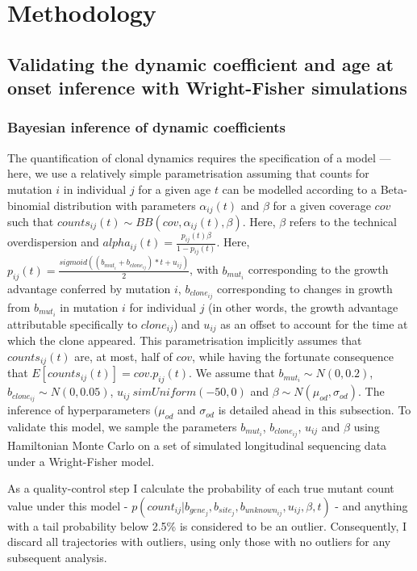 \section{Methodology}

\subsection{Validating the dynamic coefficient and age at onset inference with Wright-Fisher simulations}

\subsubsection{Bayesian inference of dynamic coefficients}

The quantification of clonal dynamics requires the specification of a model --- here, we use a relatively simple parametrisation assuming that counts for mutation $i$ in individual $j$ for a given age $t$ can be modelled according to a Beta-binomial distribution with parameters $\alpha_{ij}(t)$ and $\beta$ for a given coverage $cov$ such that $counts_{ij}(t) \sim BB(cov,\alpha_{ij}(t),\beta)$. Here, $\beta$ refers to the technical overdispersion and $alpha_{ij}(t) = \frac{p_{ij}(t)\beta}{1-p_{ij}(t)}$. Here, $p_{ij}(t) = \frac{sigmoid((b_{mut_i} + b_{clone_{ij}}) * t + u_{ij})}{2}$, with $b_{mut_i}$ corresponding to the growth advantage conferred by mutation $i$, $b_{clone_{ij}}$ corresponding to changes in growth from $b_{mut_i}$ in mutation $i$ for individual $j$ (in other words, the growth advantage attributable specifically to $clone_{ij}$) and $u_{ij}$ as an offset to account for the time at which the clone appeared. This parametrisation implicitly assumes that $counts_{ij}(t)$ are, at most, half of $cov$, while having the fortunate consequence that $E[counts_{ij}(t)] = cov.p_{ij}(t)$. We assume that $b_{mut_i} \sim N(0,0.2)$, $b_{clone_{ij}} \sim N(0,0.05)$, $u_{ij} \ sim Uniform(-50,0)$ and $\beta \sim N(\mu_{od},\sigma_{od})$. The inference of hyperparameters $(\mu_{od}$ and $\sigma_{od}$ is detailed ahead in this subsection. To validate this model, we sample the parameters $b_{mut_i}$, $b_{clone_{ij}}$, $u_{ij}$ and $\beta$ using Hamiltonian Monte Carlo on a set of simulated longitudinal sequencing data under a Wright-Fisher model. 

As a quality-control step I calculate the probability of each true mutant count value under this model - $p(count_{ij}|b_{gene_j},b_{site_j},b_{unknown_{ij}},u_{ij},\beta,t)$ - and anything with a tail probability below 2.5\% is considered to be an outlier. Consequently, I discard all trajectories with outliers, using only those with no outliers for any subsequent analysis.

